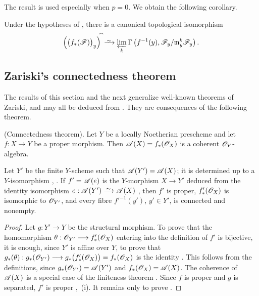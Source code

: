 \begin{env}[4.2.3]
\label{III.4.2.3}
The result  is used especially when $p=0$.
We obtain the following corollary.
\end{env}

\begin{corollary}[4.2.4]
\label{III.4.2.4}
Under the hypotheses of , there is a canonical
topological isomorphism
\[
  \Bigl(\bigl(f_*(\sh{F})\bigr)_y\Bigr)^{\widehat{\,}}
  \isoto
  \varprojlim_k
  \Gamma\left(
    f^{-1}(y),
    \sh{F}_y/\mathfrak{m}_y^k\sh{F}_y
  \right).
\]
\end{corollary}


\subsection{Zariski's connectedness theorem}
\label{subsection:III.4.3}
\label{III.4.3}

The results of this section and the next generalize well-known
theorems of Zariski, and may all be deduced from
.  They are consequences of the following theorem.

\begin{theorem}[4.3.1]
\label{III.4.3.1}
\textnormal{(Connectedness theorem).}
Let $Y$ be a locally Noetherian prescheme and let $f:X\to Y$ be a
proper morphism.  Then $\mathscr{A}(X)=f_*(\mathscr{O}_X)$
is a coherent $\mathscr{O}_Y$-algebra.


Let $Y'$ be the finite $Y$-scheme such that
$\mathscr{A}(Y')=\mathscr{A}(X)$; it is determined up to a $Y$-isomorphism
, .
If $f'=\mathscr{A}(e)$ is the $Y$-morphism $X\to Y'$ deduced from the
identity isomorphism $e:\sh{A}(Y')\isoto\sh{A}(X)$
, then $f'$ is proper,
$f'_*(\mathscr{O}_X)$ is isomorphic to $\mathscr{O}_{Y'}$, and every fibre
$f'^{-1}(y')$, $y'\in Y'$, is connected and nonempty.
\end{theorem}

\begin{proof}
Let $g:Y'\to Y$ be the structural morphism.  To prove that the
homomorphism $\theta:\mathscr{O}_{Y'}\longrightarrow f'_*(\mathscr{O}_X)$
entering into the definition of $f'$ is bijective, it is enough,
since $Y'$ is affine over $Y$, to prove that $g_*(\theta):
g_*(\mathscr{O}_{Y'})
\longrightarrow
g_*\bigl(f'_*(\mathscr{O}_X)\bigr)
=
f_*(\mathscr{O}_X)$
is the identity .  This follows from the
definitions, since
$g_*(\mathscr{O}_{Y'})=\mathscr{A}(Y')$ and
$f_*(\mathscr{O}_X)=\mathscr{A}(X)$.
The coherence of $\mathscr{A}(X)$ is a special case of the finiteness
theorem .  Since $f$ is proper and $g$ is separated,
$f'$ is proper ,~(i).  It remains only to prove
.
\end{proof}

